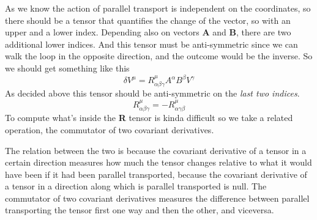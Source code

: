 As we know the action of parallel transport is independent on the coordinates, so there should be a tensor that quantifies the change of the vector, so with an upper and a lower index. Depending also on vectors \textbf{A} and \textbf{B}, there are two additional lower indices. And this tensor must be anti-symmetric since we can walk the loop in the opposite direction, and the outcome would be the inverse. So we should get something like this
\begin{equation}
\delta V^{\mu } = R^{\mu }_{\alpha \beta \gamma }A^{\alpha }B^{\beta }V^{\gamma}
\end{equation}
As decided above this tensor should be anti-symmetric on the \emph{last two indices}.
\[
R^{\mu }_{\alpha \beta \gamma } = - R^{\mu }_{\alpha \gamma  \beta }
\]
To compute what's inside the \textbf{R} tensor is kinda difficult so we take a related operation, the commutator of two covariant derivatives. \par
The relation between the two is because the covariant derivative of a tensor in a certain direction measures how much the tensor changes relative to what it would have been if it had been parallel transported, because the covariant derivative of a tensor in a direction along which is parallel transported is null. The commutator of two covariant derivatives measures the difference between parallel transporting the tensor first one way and then the other, and viceversa.\bigskip


